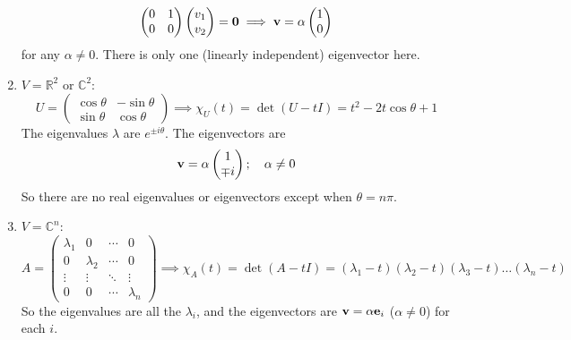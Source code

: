 \begin{enumerate}
\[\begin{pmatrix}
			      0 & 1 \\ 0 & 0
		      \end{pmatrix}\begin{pmatrix}
			      v_1 \\ v_2
		      \end{pmatrix} = \vb 0 \implies \vb v = \alpha\begin{pmatrix}
			      1 \\ 0
		      \end{pmatrix}
	      \]
	      for any \(\alpha \neq 0\).
	      There is only one (linearly independent) eigenvector here.
	\item \(V = \mathbb R^2\) or \(\mathbb C^2\):
	      \[
		      U = \begin{pmatrix}
			      \cos\theta & -\sin\theta \\ \sin\theta & \cos\theta
		      \end{pmatrix} \implies \chi_U(t) = \det(U - tI) = t^2 - 2t\cos\theta + 1
	      \]
	      The eigenvalues \(\lambda\) are \(e^{\pm i \theta}\).
	      The eigenvectors are
	      \[
		      \vb v = \alpha \begin{pmatrix}
			      1 \\ \mp i
		      \end{pmatrix};\quad \alpha \neq 0
	      \]
	      So there are no real eigenvalues or eigenvectors except when \(\theta = n \pi\).
	\item \(V = \mathbb C^n\):
	      \[
		      A = \begin{pmatrix}
			      \lambda_1 & 0         & \cdots & 0         \\
			      0         & \lambda_2 & \cdots & 0         \\
			      \vdots    & \vdots    & \ddots & \vdots    \\
			      0         & 0         & \cdots & \lambda_n
		      \end{pmatrix} \implies \chi_A(t) = \det(A - tI) = (\lambda_1 - t)(\lambda_2 - t)(\lambda_3 - t)\dots(\lambda_n - t)
	      \]
	      So the eigenvalues are all the \(\lambda_i\), and the eigenvectors are \(\vb v = \alpha \vb e_i\) (\(\alpha \neq 0\)) for each \(i\).
\end{enumerate}

